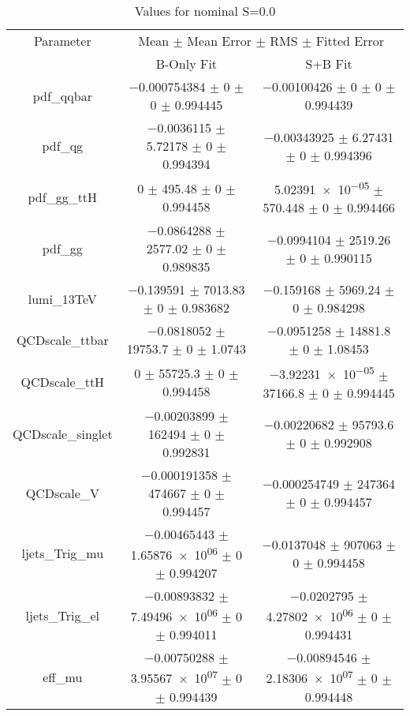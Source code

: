 \begin{table}
\centering
\caption{Values for nominal S=0.0}
\begin{tabular}{ccc}
\toprule
Parameter & \multicolumn{2}{c}{Mean $\pm$ Mean Error $\pm$ RMS $\pm$ Fitted Error}\\
 & B-Only Fit & S+B Fit\\
\midrule
pdf\_qqbar & \num{-0.000754384} $\pm$ \num{0} $\pm$ \num{0} $\pm$ \num{0.994445} & \num{-0.00100426} $\pm$ \num{0} $\pm$ \num{0} $\pm$ \num{0.994439}\\
pdf\_qg & \num{-0.0036115} $\pm$ \num{5.72178} $\pm$ \num{0} $\pm$ \num{0.994394} & \num{-0.00343925} $\pm$ \num{6.27431} $\pm$ \num{0} $\pm$ \num{0.994396}\\
pdf\_gg\_ttH & \num{0} $\pm$ \num{495.48} $\pm$ \num{0} $\pm$ \num{0.994458} & \num{5.02391e-05} $\pm$ \num{570.448} $\pm$ \num{0} $\pm$ \num{0.994466}\\
pdf\_gg & \num{-0.0864288} $\pm$ \num{2577.02} $\pm$ \num{0} $\pm$ \num{0.989835} & \num{-0.0994104} $\pm$ \num{2519.26} $\pm$ \num{0} $\pm$ \num{0.990115}\\
lumi\_13TeV & \num{-0.139591} $\pm$ \num{7013.83} $\pm$ \num{0} $\pm$ \num{0.983682} & \num{-0.159168} $\pm$ \num{5969.24} $\pm$ \num{0} $\pm$ \num{0.984298}\\
QCDscale\_ttbar & \num{-0.0818052} $\pm$ \num{19753.7} $\pm$ \num{0} $\pm$ \num{1.0743} & \num{-0.0951258} $\pm$ \num{14881.8} $\pm$ \num{0} $\pm$ \num{1.08453}\\
QCDscale\_ttH & \num{0} $\pm$ \num{55725.3} $\pm$ \num{0} $\pm$ \num{0.994458} & \num{-3.92231e-05} $\pm$ \num{37166.8} $\pm$ \num{0} $\pm$ \num{0.994445}\\
QCDscale\_singlet & \num{-0.00203899} $\pm$ \num{162494} $\pm$ \num{0} $\pm$ \num{0.992831} & \num{-0.00220682} $\pm$ \num{95793.6} $\pm$ \num{0} $\pm$ \num{0.992908}\\
QCDscale\_V & \num{-0.000191358} $\pm$ \num{474667} $\pm$ \num{0} $\pm$ \num{0.994457} & \num{-0.000254749} $\pm$ \num{247364} $\pm$ \num{0} $\pm$ \num{0.994457}\\
ljets\_Trig\_mu & \num{-0.00465443} $\pm$ \num{1.65876e+06} $\pm$ \num{0} $\pm$ \num{0.994207} & \num{-0.0137048} $\pm$ \num{907063} $\pm$ \num{0} $\pm$ \num{0.994458}\\
ljets\_Trig\_el & \num{-0.00893832} $\pm$ \num{7.49496e+06} $\pm$ \num{0} $\pm$ \num{0.994011} & \num{-0.0202795} $\pm$ \num{4.27802e+06} $\pm$ \num{0} $\pm$ \num{0.994431}\\
eff\_mu & \num{-0.00750288} $\pm$ \num{3.95567e+07} $\pm$ \num{0} $\pm$ \num{0.994439} & \num{-0.00894546} $\pm$ \num{2.18306e+07} $\pm$ \num{0} $\pm$ \num{0.994448}\\

\end{tabular}
\end{table}
